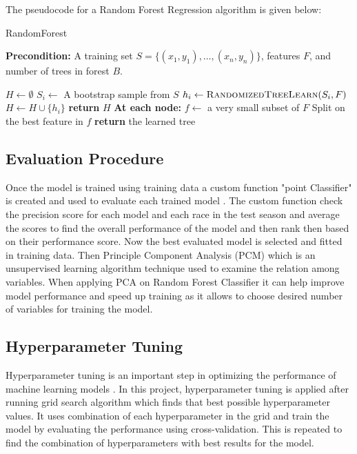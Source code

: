 \documentclass[11pt,article,oneside]{article}
\begin{document}
The pseudocode for a Random Forest Regression algorithm \citep{ref4} is given below:
\begin{algorithm}
    \caption{RandomForest}
    \textbf{Precondition:} A training set $S = \{(x_1,y_1), \ldots, (x_n,y_n)\}$, features $F$, and number of trees in forest $B$.
    \begin{algorithmic}[1]
        \State $H \gets \emptyset$
            \State $S_i \gets$ A bootstrap sample from $S$
            \State $h_i \gets \textproc{RandomizedTreeLearn}(S_i, F)$
            \State $H \gets H \cup \{h_i\}$
        \EndFor
        \State \textbf{return} $H$
    \EndFunction
        \State \textbf{At each node:}
        \State $f \gets$ a very small subset of $F$
        \State Split on the best feature in $f$
        \State \textbf{return} the learned tree
    \EndFunction
    \end{algorithmic}
\end{algorithm}




\subsection{Evaluation Procedure}
Once the model is trained using training data a custom function "point Classifier" is created and used to evaluate each trained model \citep{ref5}. The custom function check the precision score for each model and each race in the test season and average the scores to find the overall performance of the model and then rank then based on their performance score.
Now the best evaluated model is selected and fitted in training data. Then Principle Component Analysis (PCM) \citep{ref6} which is an unsupervised learning algorithm technique used to examine the relation among variables. When applying PCA on Random Forest Classifier it can help improve model performance and speed up training as it allows to choose desired number of variables for training the model.


\subsection{Hyperparameter Tuning}
Hyperparameter tuning is an important step in optimizing the performance of machine learning models \citep{ref7}. In this project, hyperparameter tuning is applied after running grid search algorithm which finds that best possible hyperparameter values. It uses combination of each hyperparameter in the grid and train the model by evaluating the performance using cross-validation.
This is repeated to find the combination of hyperparameters with best results for the model.
\end{document}
